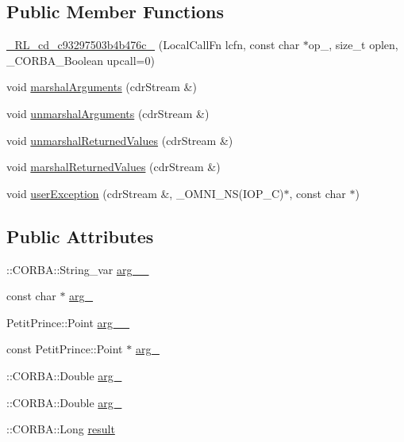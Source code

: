 \subsection*{Public Member Functions}
\begin{DoxyCompactItemize}
\item 
\hyperlink{class__0_r_l__cd__c93297503b4b476c__31000000_a47569d81948b4307436c980a6ef3c09e}{\+\_\+R\+L\+\_\+cd\+\_\+c93297503b4b476c\+\_} (Local\+Call\+Fn lcfn, const char $\ast$op\+\_\+, size\+\_\+t oplen, \+\_\+\+C\+O\+R\+B\+A\+\_\+\+Boolean upcall=0)
\item 
void \hyperlink{class__0_r_l__cd__c93297503b4b476c__31000000_a7e455e82866202c57a65e9a8d1a82b04}{marshal\+Arguments} (cdr\+Stream \&)
\item 
void \hyperlink{class__0_r_l__cd__c93297503b4b476c__31000000_ae8ad400b7c9b9380a51ae3a4eab854c3}{unmarshal\+Arguments} (cdr\+Stream \&)
\item 
void \hyperlink{class__0_r_l__cd__c93297503b4b476c__31000000_ad1c3afd1b1cabc40ae681a860e028842}{unmarshal\+Returned\+Values} (cdr\+Stream \&)
\item 
void \hyperlink{class__0_r_l__cd__c93297503b4b476c__31000000_a65934092e91506fde94dbe28eb952759}{marshal\+Returned\+Values} (cdr\+Stream \&)
\item 
void \hyperlink{class__0_r_l__cd__c93297503b4b476c__31000000_abf144e26cb2c3cbaa98e0ed2cdf5c66d}{user\+Exception} (cdr\+Stream \&, \+\_\+\+O\+M\+N\+I\+\_\+\+NS(I\+O\+P\+\_\+C)$\ast$, const char $\ast$)
\end{DoxyCompactItemize}
\subsection*{Public Attributes}
\begin{DoxyCompactItemize}
\item 
\+::C\+O\+R\+B\+A\+::\+String\+\_\+var \hyperlink{class__0_r_l__cd__c93297503b4b476c__31000000_a363b01496bb066cf3148298983a6f5ca}{arg\+\_\+\_\+}
\item 
const char $\ast$ \hyperlink{class__0_r_l__cd__c93297503b4b476c__31000000_ab8f8fb171826c479fa1d20a6ae75bc8a}{arg\+\_}
\item 
Petit\+Prince\+::\+Point \hyperlink{class__0_r_l__cd__c93297503b4b476c__31000000_abe834bb7ce68fa30fbf50962745bdd51}{arg\+\_\+\_\+}
\item 
const Petit\+Prince\+::\+Point $\ast$ \hyperlink{class__0_r_l__cd__c93297503b4b476c__31000000_ad21353f2fa5950438e3ed7ca1077177b}{arg\+\_}
\item 
\+::C\+O\+R\+B\+A\+::\+Double \hyperlink{class__0_r_l__cd__c93297503b4b476c__31000000_ad26a41851d02b94505f3e96984968453}{arg\+\_}
\item 
\+::C\+O\+R\+B\+A\+::\+Double \hyperlink{class__0_r_l__cd__c93297503b4b476c__31000000_a836a674a6af5f0de805e77e06cf63fd5}{arg\+\_}
\item 
\+::C\+O\+R\+B\+A\+::\+Long \hyperlink{class__0_r_l__cd__c93297503b4b476c__31000000_a6e7a1986f3ea1dda54668466a335a2e2}{result}
\end{DoxyCompactItemize}
